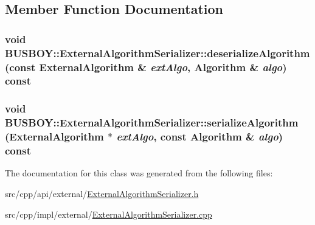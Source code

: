 \subsection{Member Function Documentation}
\hypertarget{classBUSBOY_1_1ExternalAlgorithmSerializer_a2b797895bfe95272cc5d53d08381a10c}{
\subsubsection[{deserializeAlgorithm}]{\setlength{\rightskip}{0pt plus 5cm}void BUSBOY::ExternalAlgorithmSerializer::deserializeAlgorithm (const {\bf ExternalAlgorithm} \& {\em extAlgo}, \/  {\bf Algorithm} \& {\em algo}) const}}
\label{classBUSBOY_1_1ExternalAlgorithmSerializer_a2b797895bfe95272cc5d53d08381a10c}
\hypertarget{classBUSBOY_1_1ExternalAlgorithmSerializer_a7dee865fb56d7d108d23a739891823c5}{
\subsubsection[{serializeAlgorithm}]{\setlength{\rightskip}{0pt plus 5cm}void BUSBOY::ExternalAlgorithmSerializer::serializeAlgorithm ({\bf ExternalAlgorithm} $\ast$ {\em extAlgo}, \/  const {\bf Algorithm} \& {\em algo}) const}}
\label{classBUSBOY_1_1ExternalAlgorithmSerializer_a7dee865fb56d7d108d23a739891823c5}


The documentation for this class was generated from the following files:\begin{DoxyCompactItemize}
\item 
src/cpp/api/external/\hyperlink{ExternalAlgorithmSerializer_8h}{ExternalAlgorithmSerializer.h}\item 
src/cpp/impl/external/\hyperlink{ExternalAlgorithmSerializer_8cpp}{ExternalAlgorithmSerializer.cpp}\end{DoxyCompactItemize}
